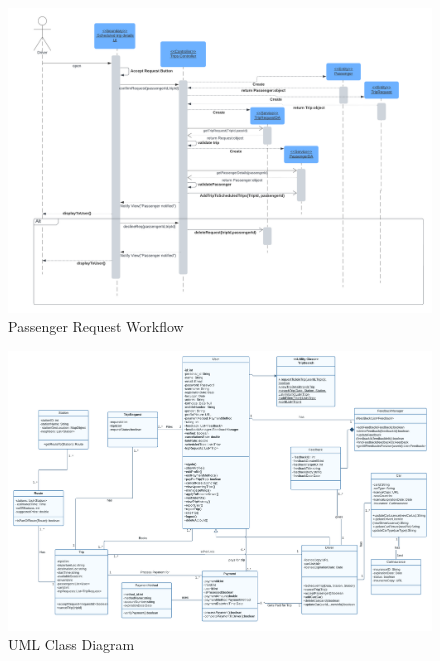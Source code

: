 \documentclass[a4paper, 12pt]{report} %
\begin{document}
        \FloatBarrier

        \begin{figure}
            \centering
            \includegraphics[width=\linewidth]{Images/Driver Request.png}
            \caption{Passenger Request Workflow}
            \label{fig:seq_dig_driver_request}
        \end{figure}

        \FloatBarrier

        \begin{figure}
            \centering
            \includegraphics[width=\linewidth]{Images/UML Class.png}
            \caption{UML Class Diagram}
            \label{fig:class_diagram}
        \end{figure}
\end{document}
